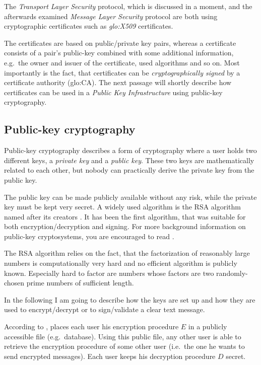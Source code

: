 The  \emph{Transport Layer  Security} protocol,  which is  discussed  in a
moment, and the afterwards examined \emph{Message Layer Security} protocol
are  both using cryptographic  certificates such  as \emph{\gls{glo:X509}}
certificates.

The  certificates  are  based  on  public/private  key  pairs,  whereas  a
certificate consists of a  pair's public-key combined with some additional
information, e.g.~the owner and issuer of the certificate, used algorithms
and  so  on.  Most  importantly  is the  fact,  that  certificates can  be
\emph{cryptographically    signed}     by    a    certificate    authority
(\gls{glo:CA}). The  next passage  will shortly describe  how certificates
can  be  used  in  a  \emph{Public Key  Infrastructure}  using  public-key
cryptography.

\subsection{Public-key cryptography}

Public-key  cryptography describes  a form  of cryptography  where  a user
holds  two  different  keys,  a  \emph{private  key}  and  a  \emph{public
  key}.  These two  keys are  mathematically  related to  each other,  but
nobody can practically derive the private key from the public key.

The public key can be made  publicly available without any risk, while the
private key must  be kept very secret. A widely used  algorithm is the RSA
algorithm named  after its  creators \citet*{rivest77method}. It  has been
the first algorithm, that  was suitable for both encryption/decryption and
signing.  For more background information on public-key cryptosystems, you
are encouraged to read \cite{rivest77method,diffie76new}.

The RSA algorithm relies on the fact, that the factorization of reasonably
large numbers is  computationally very hard and no  efficient algorithm is
publicly known.  Especially  hard to factor are numbers  whose factors are
two randomly-chosen prime numbers of sufficient length.

In the following  I am going to describe  how the keys are set  up and how
they are used to encrypt/decrypt or to sign/validate a clear text message.

According  to  \cite{rivest77method},  places  each  user  his  encryption
procedure $E$  in a publicly accessible file  (e.g.~database).  Using this
public file, any  other user is able to  retrieve the encryption procedure
of   some  other   user  (i.e.~the   one  he   wants  to   send  encrypted
messages). Each user keeps his decryption procedure $D$ secret.

